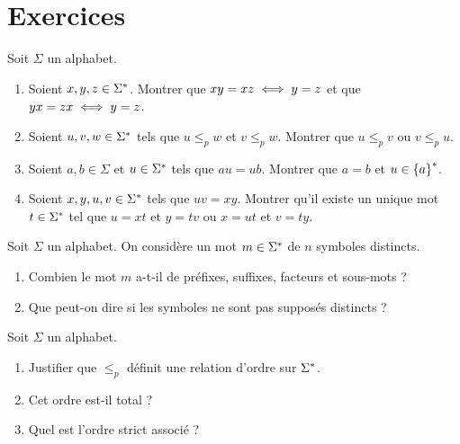 \section*{Exercices}

\begin{exo}
Soit \(\Sigma\) un alphabet.

\begin{enumerate}
    \item Soient \(x,y,z\in\Sigma^{*}\). Montrer que \(xy=xz\iff y=z\) et que \(yx=zx\iff y=z\). \\
    \item Soient \(u,v,w\in\Sigma^{*}\) tels que \(u\leq_pw\) et \(v\leq_pw\). Montrer que \(u\leq_pv\) ou \(v\leq_pu\). \\
    \item Soient \(a,b\in\Sigma\) et \(u\in\Sigma^{*}\) tels que \(au=ub\). Montrer que \(a=b\) et \(u\in\left\lbrace a\right\rbrace^{*}\). \\
    \item Soient \(x,y,u,v\in\Sigma^{*}\) tels que \(uv=xy\). Montrer qu'il existe un unique mot \(t\in\Sigma^{*}\) tel que \(u=xt\) et \(y=tv\) ou \(x=ut\) et \(v=ty\).
\end{enumerate}
\end{exo}

\begin{exo}
Soit \(\Sigma\) un alphabet. On considère un mot \(m\in\Sigma^{*}\) de \(n\) symboles distincts.

\begin{enumerate}
    \item Combien le mot \(m\) a-t-il de préfixes, suffixes, facteurs et sous-mots ? \\
    \item Que peut-on dire si les symboles ne sont pas supposés distincts ?
\end{enumerate}
\end{exo}

\begin{exo}
Soit \(\Sigma\) un alphabet.

\begin{enumerate}
    \item Justifier que \(\leq_p\) définit une relation d'ordre sur \(\Sigma^{*}\). \\
    \item Cet ordre est-il total ? \\
    \item Quel est l'ordre strict associé ?
\end{enumerate}
\end{exo}

